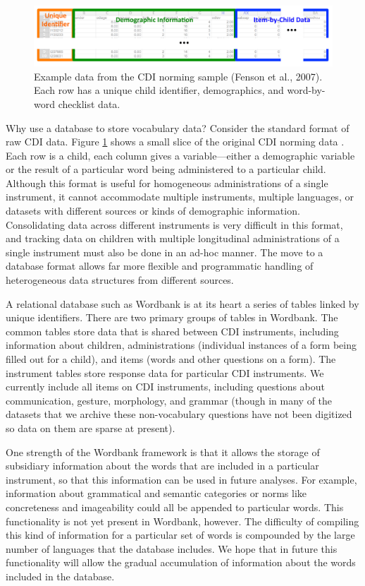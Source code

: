 \documentclass[man,noapacite]{apa}
\begin{document}
\begin{figure}[t]
\centering
\includegraphics[width=5in]{figures/itembychild.pdf}
\caption{\label{fig:data} Example data from the CDI norming sample (Fenson et al., 2007). Each row has a unique child identifier, demographics, and word-by-word checklist data. }
\end{figure}

Why use a database to store vocabulary data? Consider the standard format of raw CDI data. Figure \ref{fig:data} shows a small slice of the original CDI norming data \cite{fenson1994,fenson2007}. Each row is a child, each column gives a variable---either a demographic variable or the result of a particular word being administered to a particular child. Although this format is useful for homogeneous administrations of a single instrument, it cannot accommodate multiple instruments, multiple languages, or datasets with different sources or kinds of demographic information. Consolidating data across different instruments is very difficult in this format, and tracking data on children with multiple longitudinal administrations of a single instrument must also be done in an ad-hoc manner. The move to a database format allows far more flexible and programmatic handling of heterogeneous data structures from different sources. 

A relational database such as Wordbank is at its heart a series of tables linked by unique identifiers. There are two primary groups of tables in Wordbank. The common tables store data that is shared between CDI instruments, including information about children, administrations (individual instances of a form being filled out for a child), and items (words and other questions on a form). The instrument tables store response data for particular CDI instruments. We currently include all items on CDI instruments, including questions about communication, gesture, morphology, and grammar (though in many of the datasets that we archive these non-vocabulary questions have not been digitized so data on them are sparse at present). 

One strength of the Wordbank framework is that it allows the storage of subsidiary information about the words that are included in a particular instrument, so that this information can be used in future analyses. For example, information about grammatical and semantic categories or norms like concreteness and imageability could all be appended to particular words. This functionality is not yet present in Wordbank, however. The difficulty of compiling this kind of information for a particular set of words is compounded by the large number of languages that the database includes. We hope that in future this functionality will allow the gradual accumulation of information about the words included in the database.
\end{document}
